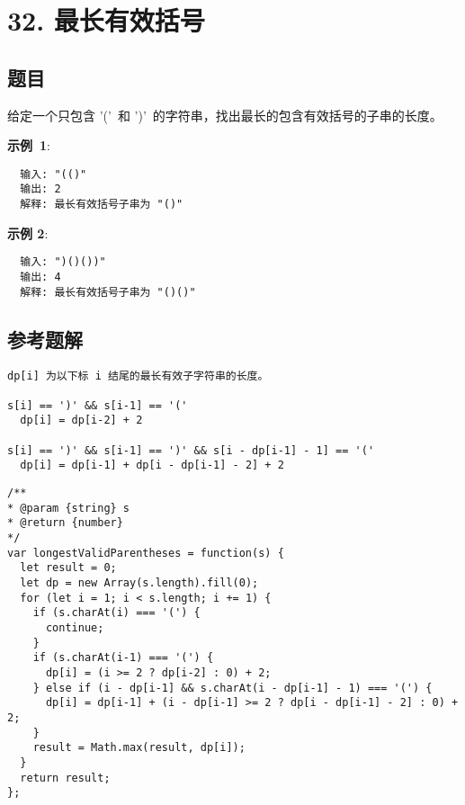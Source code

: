\newpage
\section{32. 最长有效括号}
\label{leetcode:32}

\subsection{题目}

给定一个只包含 '(' 和 ')' 的字符串，找出最长的包含有效括号的子串的长度。

\textbf{示例 1}:

\begin{verbatim}
  输入: "(()"
  输出: 2
  解释: 最长有效括号子串为 "()"
\end{verbatim}

\textbf{示例 2}:

\begin{verbatim}
  输入: ")()())"
  输出: 4
  解释: 最长有效括号子串为 "()()"
\end{verbatim}

\subsection{参考题解}

\begin{verbatim}
dp[i] 为以下标 i 结尾的最长有效子字符串的长度。

s[i] == ')' && s[i-1] == '('
  dp[i] = dp[i-2] + 2

s[i] == ')' && s[i-1] == ')' && s[i - dp[i-1] - 1] == '('
  dp[i] = dp[i-1] + dp[i - dp[i-1] - 2] + 2
\end{verbatim}

\begin{verbatim}
/**
* @param {string} s
* @return {number}
*/
var longestValidParentheses = function(s) {
  let result = 0;
  let dp = new Array(s.length).fill(0);
  for (let i = 1; i < s.length; i += 1) {
    if (s.charAt(i) === '(') {
      continue;
    }
    if (s.charAt(i-1) === '(') {
      dp[i] = (i >= 2 ? dp[i-2] : 0) + 2;
    } else if (i - dp[i-1] && s.charAt(i - dp[i-1] - 1) === '(') {
      dp[i] = dp[i-1] + (i - dp[i-1] >= 2 ? dp[i - dp[i-1] - 2] : 0) + 2;
    }
    result = Math.max(result, dp[i]);
  }
  return result;
};
\end{verbatim}

